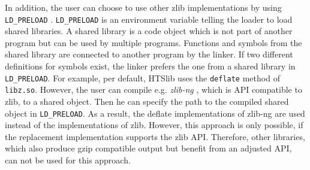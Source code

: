 In addition, the user can choose to use other zlib implementations by using \texttt{LD\_PRELOAD} \cite{myers_intercepting_nodate-1}. \texttt{LD\_PRELOAD} is an environment variable telling the loader to load shared libraries. A shared library is a code object which is not part of another program but can be used by multiple programs. Functions and symbols from the shared library are connected to another program by the linker. If two different definitions for symbols exist, the linker prefers the one from a shared library in \texttt{LD\_PRELOAD}. For example, per default, HTSlib uses the \texttt{deflate} method of \texttt{libz.so}. However, the user can compile e.g. \textit{zlib-ng} \cite{noauthor_zlib-ngzlib-ng_2024}, which is API compatible to zlib, to a shared object. Then he can specify the path to the compiled shared object in \texttt{LD\_PRELOAD}. As a result, the deflate implementations of zlib-ng are used instead of the implementations of zlib. However, this approach is only possible, if the replacement implementation supports the zlib API. Therefore, other libraries, which also produce gzip compatible output but benefit from an adjusted API, can not be used for this approach. 


